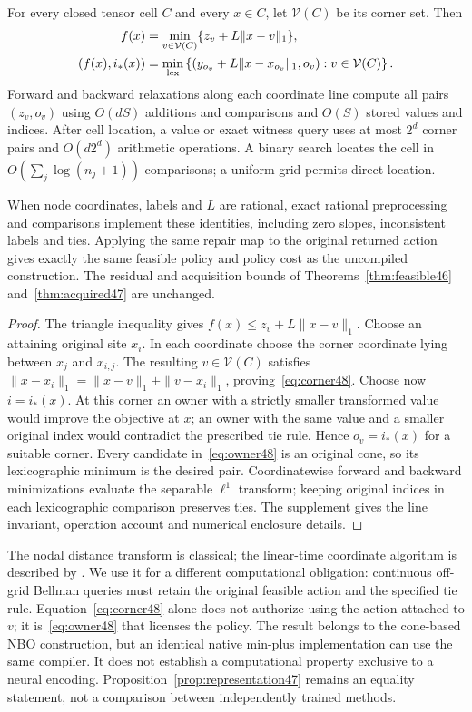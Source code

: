 \begin{theorem}\label{thm:compiler48}
For every closed tensor cell $C$ and every $x\in C$, let $\mathcal V(C)$ be its corner set. Then
\begin{align}\label{eq:corner48}
 f(x)&=\min_{v\in\mathcal V(C)}\{z_v+L\|x-v\|_1\},\\
 (f(x),i_*(x))&=\min_{\rm lex}\left\{
 \left(y_{o_v}+L\|x-x_{o_v}\|_1,o_v\right):v\in\mathcal V(C)\right\}.
 \label{eq:owner48}
\end{align}
Forward and backward relaxations along each coordinate line compute all pairs $(z_v,o_v)$ using $O(dS)$ additions and comparisons and $O(S)$ stored values and indices. After cell location, a value or exact witness query uses at most $2^d$ corner pairs and $O(d2^d)$ arithmetic operations. A binary search locates the cell in $O(\sum_j\log(n_j+1))$ comparisons; a uniform grid permits direct location.

When node coordinates, labels and $L$ are rational, exact rational preprocessing and comparisons implement these identities, including zero slopes, inconsistent labels and ties. Applying the same repair map to the original returned action gives exactly the same feasible policy and policy cost as the uncompiled construction. The residual and acquisition bounds of Theorems~\ref{thm:feasible46} and~\ref{thm:acquired47} are unchanged.
\end{theorem}
\begin{proof}
The triangle inequality gives $f(x)\le z_v+L\|x-v\|_1$. Choose an attaining original site $x_i$. In each coordinate choose the corner coordinate lying between $x_j$ and $x_{i,j}$. The resulting $v\in\mathcal V(C)$ satisfies $\|x-x_i\|_1=\|x-v\|_1+\|v-x_i\|_1$, proving~\eqref{eq:corner48}. Choose now $i=i_*(x)$. At this corner an owner with a strictly smaller transformed value would improve the objective at $x$; an owner with the same value and a smaller original index would contradict the prescribed tie rule. Hence $o_v=i_*(x)$ for a suitable corner. Every candidate in~\eqref{eq:owner48} is an original cone, so its lexicographic minimum is the desired pair. Coordinatewise forward and backward minimizations evaluate the separable $\ell^1$ transform; keeping original indices in each lexicographic comparison preserves ties. The supplement gives the line invariant, operation account and numerical enclosure details.
\end{proof}

The nodal distance transform is classical; the linear-time coordinate algorithm is described by \citet{felzenszwalb2012}. We use it for a different computational obligation: continuous off-grid Bellman queries must retain the original feasible action and the specified tie rule. Equation~\eqref{eq:corner48} alone does not authorize using the action attached to $v$; it is~\eqref{eq:owner48} that licenses the policy. The result belongs to the cone-based NBO construction, but an identical native min-plus implementation can use the same compiler. It does not establish a computational property exclusive to a neural encoding. Proposition~\ref{prop:representation47} remains an equality statement, not a comparison between independently trained methods.

